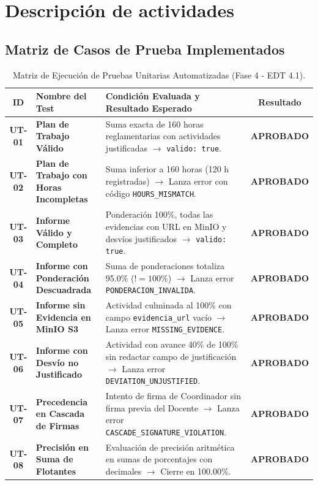 \documentclass[12pt,a4paper]{article}
\begin{document}
\section{Descripción de actividades}

\subsection{Matriz de Casos de Prueba Implementados}

\begin{table}[H]
\centering
\small
\renewcommand{\arraystretch}{1.2}
\begin{tabularx}{\textwidth}{|c|>{\raggedright\arraybackslash\bfseries}m{4.2cm}|X|c|}
\hline
\rowcolor{tableheader}
\textbf{ID} & \textbf{Nombre del Test} & \textbf{Condición Evaluada y Resultado Esperado} & \textbf{Resultado} \\ \hline
\textbf{UT-01} & Plan de Trabajo Válido & Suma exacta de 160 horas reglamentarias con actividades justificadas $\rightarrow$ \texttt{valido: true}. & \textbf{\textcolor{green!60!black}{APROBADO}} \\ \hline
\textbf{UT-02} & Plan de Trabajo con Horas Incompletas & Suma inferior a 160 horas (120 h registradas) $\rightarrow$ Lanza error con código \texttt{HOURS\_MISMATCH}. & \textbf{\textcolor{green!60!black}{APROBADO}} \\ \hline
\textbf{UT-03} & Informe Válido y Completo & Ponderación 100\%, todas las evidencias con URL en MinIO y desvíos justificados $\rightarrow$ \texttt{valido: true}. & \textbf{\textcolor{green!60!black}{APROBADO}} \\ \hline
\textbf{UT-04} & Informe con Ponderación Descuadrada & Suma de ponderaciones totaliza 95.0\% ($!= 100\%$) $\rightarrow$ Lanza error \texttt{PONDERACION\_INVALIDA}. & \textbf{\textcolor{green!60!black}{APROBADO}} \\ \hline
\textbf{UT-05} & Informe sin Evidencia en MinIO S3 & Actividad culminada al 100\% con campo \texttt{evidencia\_url} vacío $\rightarrow$ Lanza error \texttt{MISSING\_EVIDENCE}. & \textbf{\textcolor{green!60!black}{APROBADO}} \\ \hline
\textbf{UT-06} & Informe con Desvío no Justificado & Actividad con avance 40\% de 100\% sin redactar campo de justificación $\rightarrow$ Lanza error \texttt{DEVIATION\_UNJUSTIFIED}. & \textbf{\textcolor{green!60!black}{APROBADO}} \\ \hline
\textbf{UT-07} & Precedencia en Cascada de Firmas & Intento de firma de Coordinador sin firma previa del Docente $\rightarrow$ Lanza error \texttt{CASCADE\_SIGNATURE\_VIOLATION}. & \textbf{\textcolor{green!60!black}{APROBADO}} \\ \hline
\textbf{UT-08} & Precisión en Suma de Flotantes & Evaluación de precisión aritmética en sumas de porcentajes con decimales $\rightarrow$ Cierre en 100.00\%. & \textbf{\textcolor{green!60!black}{APROBADO}} \\ \hline
\end{tabularx}
\caption{Matriz de Ejecución de Pruebas Unitarias Automatizadas (Fase 4 - EDT 4.1).}
\label{tab:pruebas_unitarias}
\end{table}
\end{document}

